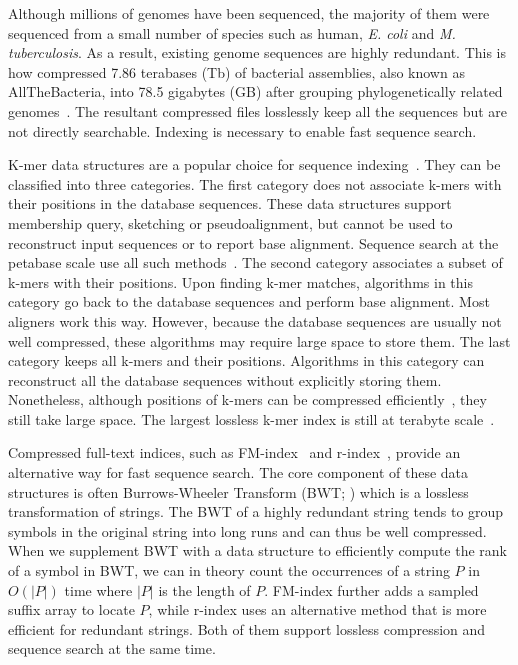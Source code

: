\documentclass[webpdf,contemporary,large,namedate]{oup-authoring-template}%
\begin{document}
Although millions of genomes have been sequenced,
the majority of them were sequenced from a small number of species such as human, \emph{E. coli} and \emph{M. tuberculosis}.
As a result, existing genome sequences are highly redundant.
This is how \citet{Hunt2024.03.08.584059} compressed 7.86 terabases (Tb) of bacterial assemblies, also known as AllTheBacteria, into 78.5 gigabytes (GB)
after grouping phylogenetically related genomes~\citep{Brinda:2024aa}.
The resultant compressed files losslessly keep all the sequences but are not directly searchable.
Indexing is necessary to enable fast sequence search.

K-mer data structures are a popular choice for sequence indexing~\citep{Marchet:2021aa}.
They can be classified into three categories.
The first category does not associate k-mers with their positions in the database sequences.
These data structures support membership query, sketching or pseudoalignment,
but cannot be used to reconstruct input sequences or to report base alignment.
Sequence search at the petabase scale use all such methods~\citep{Edgar:2022aa,Karasikov2020.10.01.322164,Shiryev:2024aa}.
The second category associates a subset of k-mers with their positions.
Upon finding k-mer matches, algorithms in this category go back to the database sequences and perform base alignment.
Most aligners work this way.
However, because the database sequences are usually not well compressed,
these algorithms may require large space to store them.
The last category keeps all k-mers and their positions.
Algorithms in this category can reconstruct all the database sequences without explicitly storing them.
Nonetheless, although positions of k-mers can be compressed efficiently~\citep{Karasikov:2020aa},
they still take large space.
The largest lossless k-mer index is still at terabyte scale~\citep{Karasikov2020.10.01.322164}.

Compressed full-text indices, such as FM-index~\citep{DBLP:conf/focs/FerraginaM00} and r-index~\citep{DBLP:conf/soda/GagieNP18,DBLP:journals/tcs/BannaiGI20,DBLP:journals/jacm/GagieNP20},
provide an alternative way for fast sequence search.
The core component of these data structures is often Burrows-Wheeler Transform (BWT; \citealt*{Burrows:1994aa})
which is a lossless transformation of strings.
The BWT of a highly redundant string tends to group symbols in the original string into long runs
and can thus be well compressed.
When we supplement BWT with a data structure to efficiently compute the rank of a symbol in BWT,
we can in theory count the occurrences of a string $P$ in $O(|P|)$ time where $|P|$ is the length of $P$.
FM-index further adds a sampled suffix array to locate $P$,
while r-index uses an alternative method that is more efficient for redundant strings.
Both of them support lossless compression and sequence search at the same time.
\end{document}
